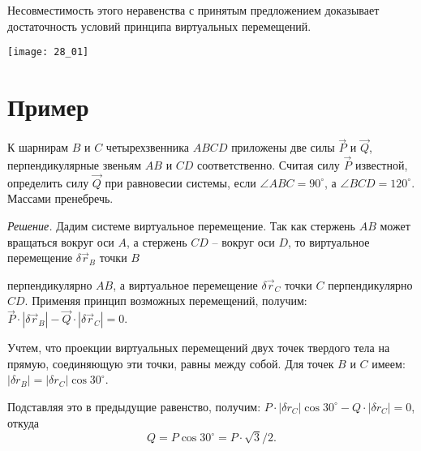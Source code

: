 Несовместимость этого неравенства с принятым предложением доказывает
достаточность условий принципа виртуальных перемещений.

\begin{minipage}{.4\textwidth}
    \texttt{[image: 28\_01]}
\end{minipage}
\begin{minipage}{.55\textwidth}
\section{Пример}
К шарнирам \( B \) и \( C \) четырехзвенника \( ABCD \) приложены две силы
\( \vec{P} \) и \( \vec{Q} \), перпендикулярные звеньям \( AB \) и \( CD \)
соответственно. Считая силу \( \vec{P} \) известной, определить силу
\( \vec{Q} \) при равновесии системы, если \( \angle ABC = 90^\circ \), а
\( \angle BCD = 120^\circ \). Массами пренебречь.

\emph{Решение.} Дадим системе виртуальное перемещение. Так как стержень \( AB \)
может вращаться вокруг оси \( A \), а стержень \( CD \) -- вокруг оси \( D \),
то виртуальное перемещение \( \delta\vec{r}_B \) точки \( B \)
\end{minipage}
перпендикулярно \( AB \), а виртуальное перемещение \( \delta\vec{r}_C \) точки
\( C \) перпендикулярно \( CD \). Применяя принцип возможных перемещений,
получим: \( \vec{P}\cdot|\delta\vec{r}_B| - \vec{Q}\cdot|\delta\vec{r}_C| = 0\).

Учтем, что проекции виртуальных перемещений двух точек твердого тела на прямую,
соединяющую эти точки, равны между собой. Для точек \( B \) и \( C \) имеем:
\( |\delta r_B| = |\delta r_C|\cos 30^\circ \).

Подставляя это в предыдущие равенство, получим:
\( P\cdot|\delta r_C|\cos 30^\circ - Q\cdot|\delta r_C| = 0 \), откуда
\[
    Q = P\cos 30^\circ = P\cdot\sqrt{3}/2.
\]

\newpage %
